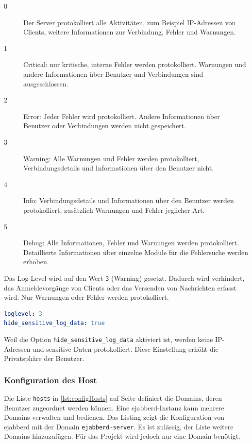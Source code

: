 \documentclass[a4paper,titlepage,halfparskip,12pt]{scrreprt}
\begin{document}
\begin{onehalfspacing}
\begin{description}
\item[0] Der Server protokolliert alle Aktivitäten, zum Beispiel IP-Adressen von Clients, weitere Informationen zur Verbindung, Fehler und Warnungen.
\item[1] Critical: nur kritische, interne Fehler werden protokolliert. Warnungen und andere Informationen über Benutzer und Verbindungen sind ausgeschlossen.
\item[2] Error: Jeder Fehler wird protokolliert. Andere Informationen über Benutzer oder Verbindungen werden nicht gespeichert.
\item[3] Warning: Alle Warnungen und Fehler werden protokolliert, Verbindungsdetails und Informationen über den Benutzer nicht.
\item[4] Info: Verbindungsdetails und Informationen über den Benutzer werden protokolliert, zusätzlich Warnungen und Fehler jeglicher Art.
\item[5] Debug: Alle Informationen, Fehler und Warnungen werden protokolliert. Detaillierte Informationen über einzelne Module für die Fehlersuche werden erhoben.
\end{description}

Das Log-Level wird auf den Wert \texttt{3} (Warning) gesetzt. Dadurch wird verhindert, das Anmeldevorgänge von Clients oder das Versenden von Nachrichten erfasst wird. Nur Warnungen oder Fehler werden protokolliert.\cite{ejabberdDoc}

\bigskip

\begin{lstlisting}[language=yaml, caption={Einstellung für das Log-Level von ejabberd}]
loglevel: 3
hide_sensitive_log_data: true
\end{lstlisting}

Weil die Option \texttt{hide\_sensitive\_log\_data} aktiviert ist, werden keine IP-Adressen und sensitive Daten protokolliert. Diese Einstellung erhöht die Privatsphäre der Benutzer.\cite{ejabberdDoc}

\subsubsection*{Konfiguration des Host}

Die Liste \texttt{hosts} in \autoref{lst:configHosts} auf Seite \pageref{lst:configHosts} definiert die Domains, deren Benutzer zugeordnet werden können. Eine ejabberd-Instanz kann mehrere Domains verwalten und bedienen. Das Listing zeigt die Konfiguration von ejabberd mit der Domain \texttt{ejabberd-server}. Es ist zulässig, der Liste weitere Domains hinzuzufügen. Für das Projekt wird jedoch nur eine Domain benötigt.


\end{onehalfspacing}
\end{document}
